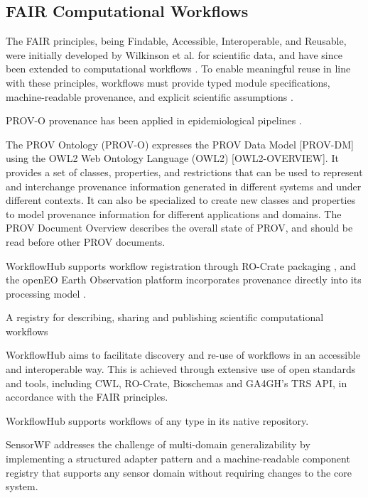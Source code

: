 \documentclass[conference]{IEEEtran}
\begin{document}
\subsection{FAIR Computational Workflows}

The FAIR principles, being Findable, Accessible, Interoperable, and Reusable, were initially developed by Wilkinson et al. for scientific data, and have since been extended to computational workflows \cite{wilkinson2016fair}. To enable meaningful reuse in line with these principles, workflows must provide typed module specifications, machine-readable provenance, and explicit scientific assumptions \cite{garijo2022fair}. 

PROV-O provenance has been applied in epidemiological pipelines \cite{mitchell2022fair}.

The PROV Ontology (PROV-O) expresses the PROV Data Model [PROV-DM] using the OWL2 Web Ontology Language (OWL2) [OWL2-OVERVIEW]. It provides a set of classes, properties, and restrictions that can be used to represent and interchange provenance information generated in different systems and under different contexts. It can also be specialized to create new classes and properties to model provenance information for different applications and domains. The PROV Document Overview describes the overall state of PROV, and should be read before other PROV documents.



WorkflowHub supports workflow registration through RO-Crate packaging \cite{wilkinson2025workflowhub}, and the openEO Earth Observation platform incorporates provenance directly into its processing model \cite{rossi2025openeo}. 



 A registry for describing, sharing and publishing scientific computational workflows

WorkflowHub aims to facilitate discovery and re-use of workflows in an accessible and interoperable way. This is achieved through extensive use of open standards and tools, including CWL, RO-Crate, Bioschemas and GA4GH's TRS API, in accordance with the FAIR principles.

WorkflowHub supports workflows of any type in its native repository. 





SensorWF addresses the challenge of multi-domain generalizability by implementing a structured adapter pattern and a machine-readable component registry that supports any sensor domain without requiring changes to the core system.
\end{document}
